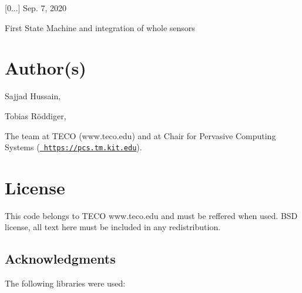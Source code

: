 \begin{DoxyItemize}
\item \mbox{[}0...\mbox{]} Sep. 7, 2020
\begin{DoxyItemize}
\item First State Machine and integration of whole sensors
\end{DoxyItemize}
\end{DoxyItemize}\hypertarget{index_author}{}\section{Author(s)}\label{index_author}

\begin{DoxyItemize}
\item Sajjad Hussain,
\item Tobias Röddiger,
\end{DoxyItemize}

The team at T\+E\+CO (www.\+teco.\+edu) and at Chair for Pervasive Computing Systems (\href{https://pcs.tm.kit.edu}{\texttt{ https\+://pcs.\+tm.\+kit.\+edu}}).\hypertarget{index_license}{}\section{License}\label{index_license}
This code belongs to T\+E\+CO www.\+teco.\+edu and must be reffered when used. B\+SD license, all text here must be included in any redistribution. \hypertarget{index_ack}{}\subsection{Acknowledgments}\label{index_ack}
The following libraries were used\+:~\newline

